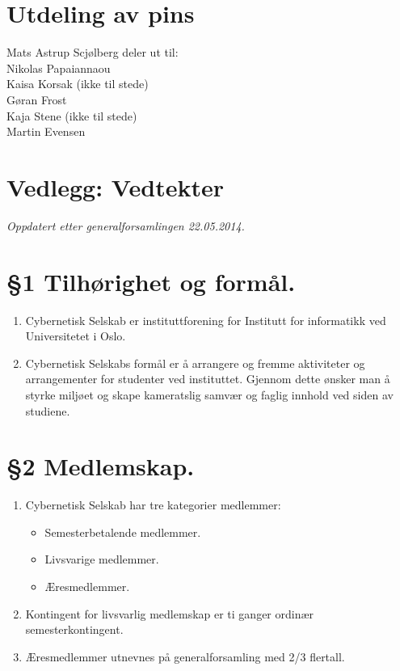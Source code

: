 \documentclass[10pt,norsk,a4paper]{article}
\begin{document}
\section{Utdeling av pins}
Mats Astrup Scjølberg deler ut til:\\
Nikolas Papaiannaou\\
Kaisa Korsak (ikke til stede)\\
Gøran Frost\\
Kaja Stene (ikke til stede)\\
Martin Evensen\\

\newpage

\section*{Vedlegg: Vedtekter}
\textit{Oppdatert etter generalforsamlingen 22.05.2014.}\\

\section*{§1 Tilhørighet og formål.}
\begin{enumerate}
	\item{Cybernetisk Selskab er instituttforening for Institutt for informatikk ved Universitetet i Oslo.}
	\item{Cybernetisk Selskabs formål er å arrangere og fremme aktiviteter og arrangementer for studenter ved instituttet. Gjennom dette ønsker man å styrke miljøet og skape kameratslig samvær og faglig innhold ved siden av studiene.}
\end{enumerate}

\section*{§2 Medlemskap.}
\begin{enumerate}
	\item{Cybernetisk Selskab har tre kategorier medlemmer:}
	\begin{itemize}
		\item{Semesterbetalende medlemmer.}
		\item{Livsvarige medlemmer.}
		\item{Æresmedlemmer.}
	\end{itemize}
	\item{Kontingent for livsvarlig medlemskap er ti ganger ordinær semesterkontingent.}
	\item{Æresmedlemmer utnevnes på generalforsamling med 2/3 flertall.}
\end{enumerate}
\end{document}

